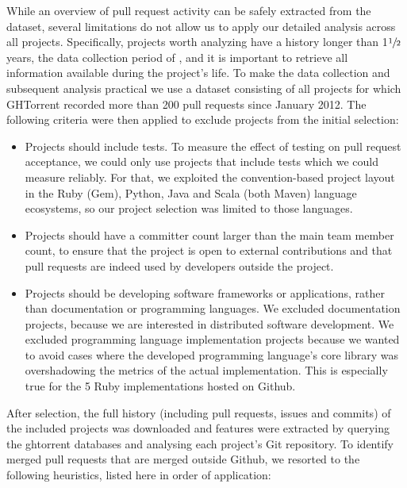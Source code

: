 \documentclass{sig-alternate}
\begin{document}
While an overview of pull request activity can be safely extracted from the \ghtorrent dataset, several limitations do not allow us to apply our detailed
analysis across all projects. Specifically, projects worth analyzing have a
history longer than 1$\sfrac{1}{2}$ years, the data collection period of \ghtorrent, and it is important to retrieve all information
available during the project's life. To make the data collection and subsequent
analysis practical we use a dataset consisting of all projects for which
GHTorrent recorded more than 200 pull requests since January 2012. The
following criteria were then applied to exclude projects from the initial
selection:

\begin{itemize}

  \item Projects should include tests. To measure the effect of testing on pull
    request acceptance, we could only use projects that include tests which we
    could measure reliably. For that, we exploited the convention-based project
    layout in the Ruby (Gem), Python, Java and Scala (both Maven) language
    ecosystems, so our project selection was limited to those languages. 

  \item Projects should have a committer count larger than the main team member
    count, to ensure that the project is open to external contributions and that
    pull requests are indeed used by developers outside the project.

  \item Projects should be developing software frameworks or applications,
    rather than documentation or programming languages. We excluded
    documentation projects, because we are interested in distributed software
    development. We excluded programming language implementation projects
    because we wanted to avoid cases where the developed programming language's
    core library was overshadowing the metrics of the actual implementation.
    This is especially true for the 5 Ruby implementations hosted on Github.

\end{itemize}

After selection, the full history (including pull requests, issues and commits)
of the included projects was downloaded and features were extracted by querying
the {\sc ght}orrent databases and analysing each project's Git repository. To
identify merged pull requests that are merged outside Github, we resorted to the following heuristics, listed here in order of application:
\end{document}
